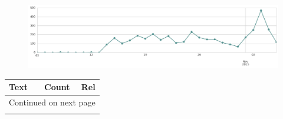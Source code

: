 \begin{figure}[htbp!]
    \centering
    \includegraphics[width=\textwidth]{twitter_all/report_images/topic-39-timeseries.jpg}
\end{figure}

\begin{longtable}{p{12.5cm}rr}
\toprule
Text & Count & Rel \\
\midrule
\endhead
\midrule
\multicolumn{3}{r}{{Continued on next page}} \\
\midrule
\endfoot


\end{longtable}
